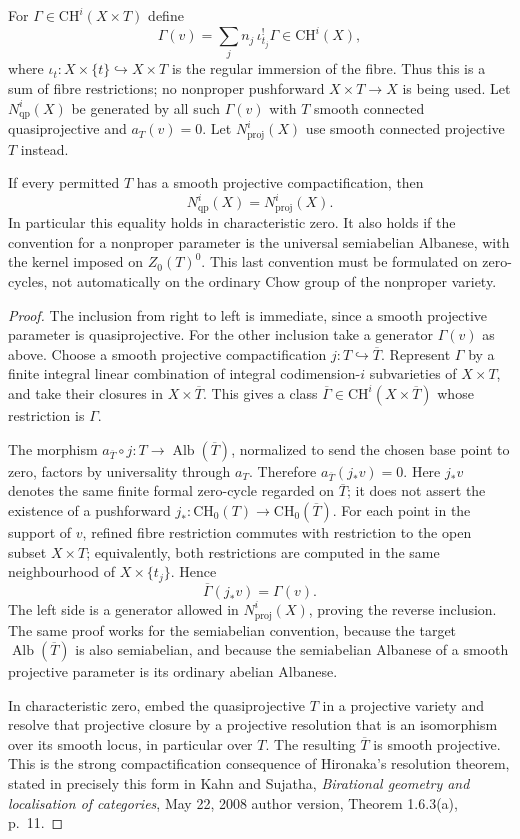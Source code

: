For $\Gamma\in\mathrm{CH}^i(X\times T)$ define
\[
 \Gamma(v)=\sum_j n_j\,\iota_{t_j}^{!}\Gamma
                         \in\mathrm{CH}^i(X),
\]
where $\iota_t:X\times\{t\}\hookrightarrow X\times T$
is the regular immersion of the fibre. Thus this is a
sum of fibre restrictions; no nonproper pushforward
$X\times T\to X$ is being used. Let $N^i_{\mathrm{qp}}(X)$
be generated by all such $\Gamma(v)$ with $T$ smooth connected
quasiprojective and $a_T(v)=0$. Let $N^i_{\mathrm{proj}}(X)$
use smooth connected projective $T$ instead.

If every permitted $T$ has a smooth projective compactification,
then
\[
 N^i_{\mathrm{qp}}(X)=N^i_{\mathrm{proj}}(X).                 \tag{AQ.14.1}
\]
In particular this equality holds in characteristic zero.
It also holds if the convention for a nonproper parameter is
the universal semiabelian Albanese, with the kernel imposed
on $Z_0(T)^0$. This last convention must be formulated on
zero-cycles, not automatically on the ordinary Chow group
of the nonproper variety.

\begin{proof}
The inclusion from right to left is immediate, since a
smooth projective parameter is quasiprojective. For the
other inclusion take a generator $\Gamma(v)$ as above.
Choose a smooth projective compactification
$j:T\hookrightarrow\overline T$. Represent $\Gamma$ by
a finite integral linear combination of integral
codimension-$i$ subvarieties of $X\times T$, and take
their closures in $X\times\overline T$. This gives a class
$\overline\Gamma\in\mathrm{CH}^i(X\times\overline T)$
whose restriction is $\Gamma$.

The morphism $a_{\overline T}\circ j:T\to
\operatorname{Alb}(\overline T)$, normalized to send the
chosen base point to zero, factors by universality through
$a_T$. Therefore
$a_{\overline T}(j_*v)=0$. Here $j_*v$ denotes the same
finite formal zero-cycle regarded on $\overline T$;
it does not assert the existence of a pushforward
$j_*:\mathrm{CH}_0(T)\to\mathrm{CH}_0(\overline T)$.
For each point in the support of $v$, refined fibre
restriction commutes with restriction to the open subset
$X\times T$; equivalently, both restrictions are computed
in the same neighbourhood of $X\times\{t_j\}$. Hence
\[
 \overline\Gamma(j_*v)=\Gamma(v).
\]
The left side is a generator allowed in
$N^i_{\mathrm{proj}}(X)$, proving the reverse inclusion.
The same proof works for the semiabelian convention,
because the target $\operatorname{Alb}(\overline T)$ is
also semiabelian, and because the semiabelian Albanese
of a smooth projective parameter is its ordinary
abelian Albanese.

In characteristic zero, embed the quasiprojective $T$
in a projective variety and resolve that projective
closure by a projective resolution that is an
isomorphism over its smooth locus, in particular over
$T$. The resulting $\overline T$ is smooth projective.
This is the strong compactification consequence of
Hironaka's resolution theorem, stated in precisely
this form in Kahn and Sujatha, \emph{Birational geometry
and localisation of categories}, May 22, 2008 author
version, Theorem 1.6.3(a), p.~11.
\end{proof}


